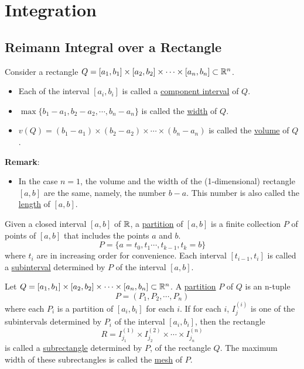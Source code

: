 \chapter{Integration}

\section{Reimann Integral over a Rectangle}

\begin{definition}
    Consider a rectangle $Q=[a_1,b_1]\times [a_2,b_2]\times \cdots \times[a_n,b_n]\subset \mathbb{R}^n$.
    \begin{itemize}
        \item Each of the interval $[a_i,b_i]$ is called a \underline{component interval} of $Q$.
        \item $\max\{b_1-a_1,b_2-a_2,\cdots ,b_n-a_n\}$ is called the \underline{width} of $Q$.
        \item $v(Q)=(b_1-a_1)\times(b_2-a_2)\times \cdots \times(b_n-a_n)$ is called the \underline{volume} of $Q$.
    \end{itemize}
\end{definition}
\noindent \textbf{Remark}:
\begin{itemize}
    \item In the case $n = 1$, the volume and the width of the (1-dimensional)
    rectangle $[a, b]$ are the same, namely, the number $b-a$. This number is also called the \underline{length} of $[a, b]$.    
\end{itemize}

\begin{definition}
    Given a closed interval $[a, b]$ of $\mathbb{R}$, a \underline{partition} of $[a, b]$ is a finite collection $P$ of points of $[a, b]$ that includes the points $a$ and $b$.
    $$P=\{a=t_0,t_1\cdots,t_{k-1},t_k=b\}$$
    where $t_i$ are in increasing order for convenience. Each interval $[t_{i-1},t_i]$ is called a \underline{subinterval} determined by $P$ of the interval $[a,b]$.
\end{definition}

\begin{definition}
    Let $Q=[a_1,b_1]\times [a_2,b_2]\times \cdots \times[a_n,b_n]\subset \mathbb{R}^n$. A \underline{partition} $P$ of $Q$ is an n-tuple $$P=(P_1,P_2,\cdots,P_n)$$ where each $P_i$ is a partition of $[a_i,b_i]$ for each $i$. 
    If for each $i$, $I^{(i)}_j$ is one of the subintervals determined by $P_i$ of the interval $[a_i,b_i]$, then the rectangle $$R=I^{(1)}_{j_1}\times I^{(2)}_{j_2}\times \cdots \times I^{(n)}_{j_n}$$ is called a \underline{subrectangle} determined by $P$, of the rectangle $Q$. 
    The maximum width of these subrectangles is called the \underline{mesh} of $P$.
\end{definition}

